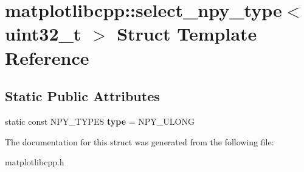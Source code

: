 \hypertarget{structmatplotlibcpp_1_1select__npy__type_3_01uint32__t_01_4}{}\section{matplotlibcpp\+:\+:select\+\_\+npy\+\_\+type$<$ uint32\+\_\+t $>$ Struct Template Reference}
\label{structmatplotlibcpp_1_1select__npy__type_3_01uint32__t_01_4}
\subsection*{Static Public Attributes}
\begin{DoxyCompactItemize}
\item 
\mbox{\label{structmatplotlibcpp_1_1select__npy__type_3_01uint32__t_01_4_a21b0fbd17b661ef512cc1c3c728dfa60}} 
static const N\+P\+Y\+\_\+\+T\+Y\+P\+ES {\bfseries type} = N\+P\+Y\+\_\+\+U\+L\+O\+NG
\end{DoxyCompactItemize}


The documentation for this struct was generated from the following file\+:\begin{DoxyCompactItemize}
\item 
matplotlibcpp.\+h\end{DoxyCompactItemize}
